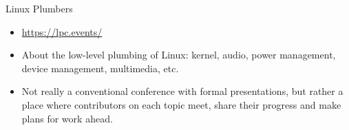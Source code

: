 \item Linux Plumbers
  \begin{itemize}
  \item \url{https://lpc.events/}
  \item About the low-level plumbing of Linux: kernel, audio, power
    management, device management, multimedia, etc.
  \item Not really a conventional conference with formal
    presentations, but rather a place where contributors on each topic
    meet, share their progress and make plans for work ahead.
  \end{itemize}

